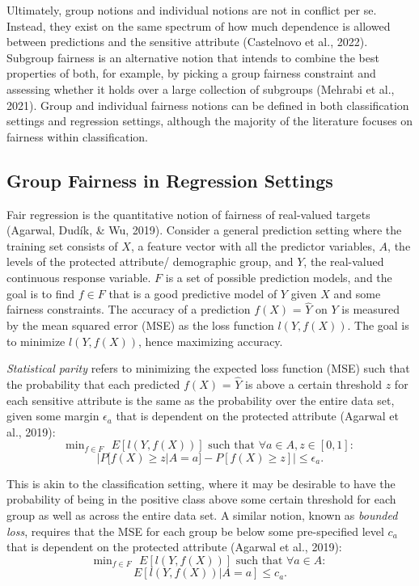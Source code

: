 \documentclass[12pt, twoside]{amherstthesis}
\begin{document}
Ultimately, group notions and individual notions are not in conflict per se. Instead, they exist on the same spectrum of how much dependence is allowed between predictions and the sensitive attribute (Castelnovo et al., 2022). Subgroup fairness is an alternative notion that intends to combine the best properties of both, for example, by picking a group fairness constraint and assessing whether it holds over a large collection of subgroups (Mehrabi et al., 2021). Group and individual fairness notions can be defined in both classification settings and regression settings, although the majority of the literature focuses on fairness within classification.

\hypertarget{group-fairness-in-regression-settings}{%
\subsection{Group Fairness in Regression Settings}\label{group-fairness-in-regression-settings}}

Fair regression is the quantitative notion of fairness of real-valued targets (Agarwal, Dudík, \& Wu, 2019). Consider a general prediction setting where the training set consists of \(X\), a feature vector with all the predictor variables, \(A\), the levels of the protected attribute/ demographic group, and \(Y\), the real-valued continuous response variable. \(F\) is a set of possible prediction models, and the goal is to find \(f \in F\) that is a good predictive model of \(Y\) given \(X\) and some fairness constraints. The accuracy of a prediction \(f(X)\) = \(\hat{Y}\) on \(Y\) is measured by the mean squared error (MSE) as the loss function \(l(Y, f(X))\). The goal is to minimize \(l(Y, f(X))\), hence maximizing accuracy.

\emph{Statistical parity} refers to minimizing the expected loss function (MSE) such that the probability that each predicted \(f(X)\) = \(\hat{Y}\) is above a certain threshold \(z\) for each sensitive attribute is the same as the probability over the entire data set, given some margin \(\epsilon_a\) that is dependent on the protected attribute (Agarwal et al., 2019):
\begin{equation}
\label{ch1eq1}
\text{min}_{f \in F} \text{ } E[l(Y, f(X))] \text{ such that } \forall a \in A, z \in [0,1]:
\end{equation}
\[ |P[f(X) \geq z | A = a] - P[f(X) \geq z]| \leq \epsilon_a.\]

This is akin to the classification setting, where it may be desirable to have the probability of being in the positive class above some certain threshold for each group as well as across the entire data set. A similar notion, known as \emph{bounded loss}, requires that the MSE for each group be below some pre-specified level \(c_a\) that is dependent on the protected attribute (Agarwal et al., 2019):
\begin{equation}
\label{ch1eq2}
\text{min}_{f \in F} \text{ } E[l(Y, f(X))] \text{ such that } \forall a \in A: 
\end{equation}
\[ E[l(Y, f(X)) | A = a] \leq c_a.\]
\end{document}
